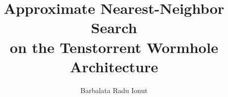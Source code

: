 \documentclass{sapthesis}
\title{Approximate Nearest-Neighbor Search\\ on the Tenstorrent Wormhole Architecture}
\author{Barbalata Radu Ionut}
\begin{document}
\lstset{language=Python}

\frontmatter

\maketitle

\dedication{
    To all the iterations that didn't work,\\
    for teaching me what would.
}



\tableofcontents

\mainmatter
\let\cleardoublepage\clearpage













\backmatter
\cleardoublepage
{}



\end{document}
